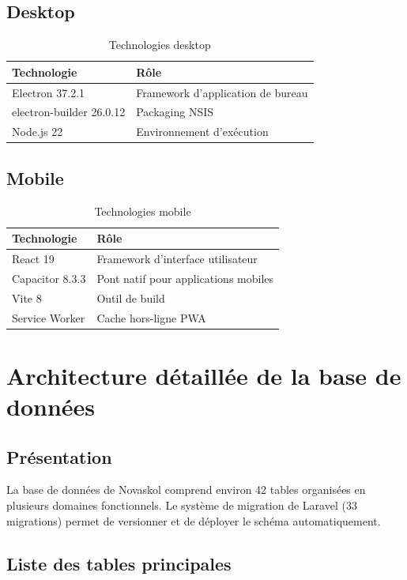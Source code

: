 \documentclass[12pt,a4paper,twoside]{report}
\begin{document}
\subsection{Desktop}

\begin{table}[h]
\centering
\caption{Technologies desktop}
\begin{tabular}{ll}
\toprule
Technologie & Rôle \\
\midrule
Electron 37.2.1 & Framework d'application de bureau \\
electron-builder 26.0.12 & Packaging NSIS \\
Node.js 22 & Environnement d'exécution \\
\bottomrule
\end{tabular}
\end{table}

\subsection{Mobile}

\begin{table}[h]
\centering
\caption{Technologies mobile}
\begin{tabular}{ll}
\toprule
Technologie & Rôle \\
\midrule
React 19 & Framework d'interface utilisateur \\
Capacitor 8.3.3 & Pont natif pour applications mobiles \\
Vite 8 & Outil de build \\
Service Worker & Cache hors-ligne PWA \\
\bottomrule
\end{tabular}
\end{table}

\section{Architecture détaillée de la base de données}

\subsection{Présentation}

La base de données de Novaskol comprend environ 42 tables organisées en plusieurs domaines fonctionnels. Le système de migration de Laravel (33 migrations) permet de versionner et de déployer le schéma automatiquement.

\subsection{Liste des tables principales}
\end{document}
